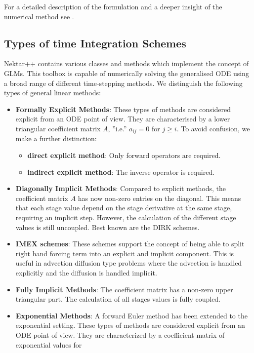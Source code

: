 For a detailed description of the formulation and a deeper insight of the
numerical method see \cite{Vostime}.


\subsection{Types of time Integration Schemes}
Nektar++ contains various classes and methods which implement the
concept of GLMs. This toolbox is capable of numerically solving the
generalised ODE using a broad range of different time-stepping
methods. We distinguish the following types of general linear methods:
\begin{itemize}
\item \textbf{Formally Explicit Methods}: These types of methods are
  considered explicit from an ODE point of view. They are
  characterised by a lower triangular coefficient matrix $A$, ''i.e.''
  $a_{ij} = 0$ for $j\geq i$. To avoid confusion, we make a further
  distinction:
  \begin{itemize}
    \item \textbf{direct explicit method}: Only forward operators are
      required.
    \item \textbf{indirect explicit method}: The inverse operator is
      required.
  \end{itemize}
  \item \textbf{Diagonally Implicit Methods}: Compared to explicit
    methods, the coefficient matrix $A$ has now non-zero entries on
    the diagonal.  This means that each stage value depend on the
    stage derivative at the same stage, requiring an implicit
    step. However, the calculation of the different stage values is
    still uncoupled. Best known are the DIRK schemes.
  \item \textbf{IMEX schemes}: These schemes support the concept of
    being able to split right hand forcing term into an explicit and
    implicit component. This is useful in advection diffusion type
    problems where the advection is handled explicitly and the
    diffusion is handled implicit.
  \item \textbf{Fully Implicit Methods}: The coefficient matrix has a
    non-zero upper triangular part. The calculation of all stages
    values is fully coupled.
  \item \textbf{Exponential Methods}: A forward Euler method has been
    extended to the exponential setting. These types of methods are
    considered explicit from an ODE point of view. They are
    characterized by a coefficient matrix of exponential values for

\end{itemize}
